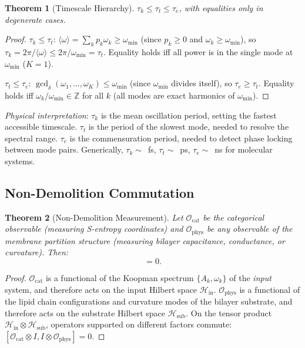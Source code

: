 \documentclass[11pt,twocolumn,a4paper]{article}
\newtheorem{theorem}{Theorem}[section]
\theoremstyle{definition}
\theoremstyle{remark}
\newcommand{\Ocat}{\mathcal{O}_{\mathrm{cat}}}
\newcommand{\Ophys}{\mathcal{O}_{\mathrm{phys}}}
\begin{document}
\begin{theorem}[Timescale Hierarchy]
\label{thm:timescales}
$\tau_k \leq \tau_t \leq \tau_e$, with equalities only in degenerate cases.
\end{theorem}

\begin{proof}
$\tau_k \leq \tau_t$: $\langle\omega\rangle = \sum_k p_k \omega_k \geq
\omega_{\min}$ (since $p_k \geq 0$ and $\omega_k \geq \omega_{\min}$),
so $\tau_k = 2\pi/\langle\omega\rangle \leq 2\pi/\omega_{\min} = \tau_t$.
Equality holds iff all power is in the single mode at $\omega_{\min}$ ($K=1$).

$\tau_t \leq \tau_e$: $\gcd_\delta(\omega_1,\ldots,\omega_K) \leq \omega_{\min}$
(since $\omega_{\min}$ divides itself), so $\tau_e \geq \tau_t$.
Equality holds iff $\omega_k / \omega_{\min} \in \mathbb{Z}$ for all $k$
(all modes are exact harmonics of $\omega_{\min}$).
\end{proof}

\textit{Physical interpretation}: $\tau_k$ is the mean oscillation period,
setting the fastest accessible timescale. $\tau_t$ is the period of the slowest
mode, needed to resolve the spectral range. $\tau_e$ is the commensuration period,
needed to detect phase locking between mode pairs. Generically,
$\tau_k \sim$~fs, $\tau_t \sim$~ps, $\tau_e \sim$~ns for molecular systems.

\subsection{Non-Demolition Commutation}

\begin{theorem}[Non-Demolition Measurement]
\label{thm:nondemo}
Let $\Ocat$ be the categorical observable (measuring S-entropy coordinates)
and $\Ophys$ be any observable of the membrane partition structure
(measuring bilayer capacitance, conductance, or curvature). Then:
\begin{equation}
[\Ocat, \Ophys] = 0.
\label{eq:commute}
\end{equation}
\end{theorem}

\begin{proof}
$\Ocat$ is a functional of the Koopman spectrum $\{A_k, \omega_k\}$ of the
\emph{input} system, and therefore acts on the input Hilbert space
$\mathcal{H}_{\mathrm{in}}$. $\Ophys$ is a functional of the lipid chain
configurations and curvature modes of the bilayer substrate, and therefore
acts on the substrate Hilbert space $\mathcal{H}_{\mathrm{sub}}$. On the tensor
product $\mathcal{H}_{\mathrm{in}} \otimes \mathcal{H}_{\mathrm{sub}}$,
operators supported on different factors commute: $[\Ocat \otimes I,
I \otimes \Ophys] = 0$.
\end{proof}
\end{document}
